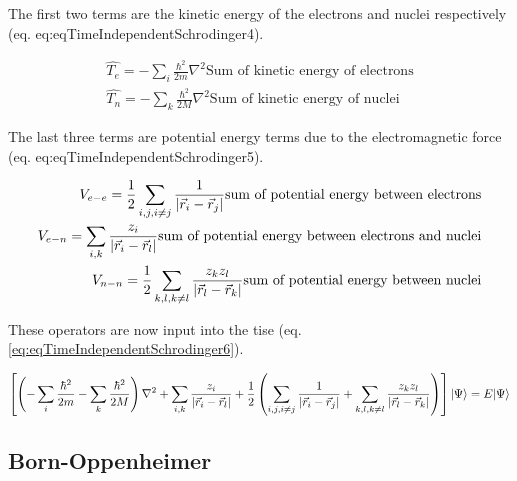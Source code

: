 The first two terms are the kinetic energy of the electrons and nuclei respectively (eq. {eq:eqTimeIndependentSchrodinger4}).

\begin{equation}
\begin{split}
\hat{T_e} = - \sum_{i} \frac{\hbar^2}{2 m}  \nabla^2 \text{Sum of kinetic energy of electrons} \\
\hat{T_n} = - \sum_{k} \frac{\hbar^2}{2 M}  \nabla^2 \text{Sum of kinetic energy of nuclei}
\end{split}
\label{eq:eqTimeIndependentSchrodinger4}
\end{equation}

The last three terms are potential energy terms due to the electromagnetic force (eq. {eq:eqTimeIndependentSchrodinger5}). 

\begin{equation}
\begin{split}
V_{e-e} = \frac{1}{2} \sum_{i,j,i \neq j} \frac{1}{\abs{\vec{r}_i - \vec{r}_j}} \text{sum of potential energy between electrons} \\
V_{e-n} = \sum_{i,k} \frac{z_i}{\abs{\vec{r}_i - \vec{r}_l}} \text{sum of potential energy between electrons and nuclei} \\
V_{n-n} = \frac{1}{2} \sum_{k,l,k \neq l} \frac{z_k z_l}{\abs{\vec{r}_l - \vec{r}_k}} \text{sum of potential energy between nuclei}
\end{split}
\label{eq:eqTimeIndependentSchrodinger5}
\end{equation}

These operators are now input into the \acrshort{tise} (eq. \ref{eq:eqTimeIndependentSchrodinger6}).


\begin{equation}
\begin{split}
\left[ \left(- \sum_{i} \frac{\hbar^2}{2 m} - \sum_{k} \frac{\hbar^2}{2 M} \right) \nabla^2  + \sum_{i,k} \frac{z_i}{\abs{\vec{r}_i - \vec{r}_l}} + \frac{1}{2} \left( \sum_{i,j,i \neq j} \frac{1}{\abs{\vec{r}_i - \vec{r}_j}} + \sum_{k,l,k \neq l} \frac{z_k z_l}{\abs{\vec{r}_l - \vec{r}_k}} \right) \right] \lvert \Psi \rangle = E \lvert \Psi \rangle
\end{split}
\label{eq:eqTimeIndependentSchrodinger6}
\end{equation}



\subsection{Born-Oppenheimer}

